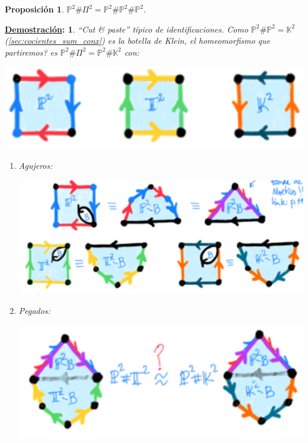 \documentclass[10pt,a4paper,openright]{book}
\theoremstyle{break}
\newtheorem*{prop}{Proposición}
\newtheorem*{demo}{\underline{Demostración}:}
\begin{document}
\begin{prop}
$\mathbb{P}^{2} \# \Pi^2 = \mathbb{P}^{2} \# \mathbb{P}^{2} \# \mathbb{P}^{2}$.
\end{prop}
\begin{demo}
    ``Cut \& paste'' típico de identificaciones. Como $\mathbb{P}^{2} \# \mathbb{P}^{2} = \mathbb{K}^2$ (\ref{sec:cocientes_sum_conx}) es la botella de Klein, el homeomorfismo que partiremos? es $\mathbb{P}^{2} \# \Pi^2 = \mathbb{P}^{2} \# \mathbb{K}^2$ con:
    \begin{center}
        \includegraphics[scale=0.3]{images/rel_fund_1} 
    \end{center}

    \begin{enumerate}
        \item Agujeros:
        \begin{center}
            \includegraphics[scale=0.3]{images/rel_fund_agujeros} 
        \end{center}

        \item Pegados:
        \begin{center}
            \includegraphics[scale=0.3]{images/rel_fund_pegados} 
        \end{center}


\end{enumerate}
\end{demo}
\end{document}
